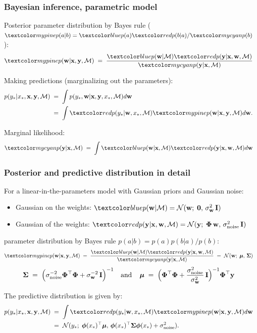 \begin{frame}
\frametitle{Bayesian inference, parametric model}

Posterior parameter distribution by Bayes rule ({\small $\Green{p(a|b)}=\Blue{p(a)} \Red{p(b|a)}/\Cyan{p(b)}$}):
\[
\Green{p({\bf w}|{\bf x},{\bf y},\mathcal{M})}\;=\;\frac{\Blue{p({\bf w}|\mathcal{M})}
\Red{p({\bf y}|{\bf x},{\bf w},\mathcal{M})}}{\Cyan{p({\bf y}|{\bf x},\mathcal{M})}}
\]

Making predictions (marginalizing out the parameters):
\[
\begin{split}
p(y_*|x_*,{\bf x}, {\bf y},\mathcal{M})\;&=\;
\int p(y_*,{\bf w}|{\bf x}, {\bf y}, x_*, \mathcal{M})d{\bf w}\\
&=\;\int \Red{p(y_*|{\bf w},x_*,\mathcal{M})}\Green{p({\bf w}|{\bf x}, {\bf y},\mathcal{M})}d{\bf w}.
\end{split}
\]

Marginal likelihood:
\[
\Cyan{p({\bf y}|{\bf x},\mathcal{M})}\;=\;
\int \Blue{p({\bf w}|\bfx,\mathcal{M})}  \Red{p(\bfy|\bfx,\bfw,\mathcal{M})}  d{\bf w}
\]
\end{frame}


\begin{frame}
\frametitle{Posterior and predictive distribution in detail}

For a linear-in-the-parameters model with Gaussian priors and Gaussian noise:
\begin{itemize}
\item Gaussian  on the weights: 
$\Blue{p(\bfw|\mathcal{M})}=\N(\bfw;\;\mathbf{0},\,\sigma_\bfw^2\,\bfI)$
\item Gaussian  of the weights:
$\Red{p(\bfy|\bfx,\bfw,\mathcal{M}})=\N(\bfy;\;\bPhi\,\bfw,\,\sigma_\mathrm{noise}^2\,\bfI)$
\end{itemize}

 parameter distribution by Bayes rule $p(a|b)=p(a)p(b|a)/p(b)$:
\[
\Green{p({\bf w}|{\bf x},{\bf y},\mathcal{M})}\;=\;\frac{\Blue{p({\bf w}|\mathcal{M})}
\Red{p({\bf y}|{\bf x},{\bf w},\mathcal{M})}}{\Cyan{p({\bf y}|{\bf x},\mathcal{M})}}
\;=\; \N(\bfw;\;\bmu,\,\bSigma)
\]
\[
\boldsymbol{\Sigma}\;=\;\left(\sigma_\mathrm{noise}^{-2}\boldsymbol{\Phi}^\top\boldsymbol{\Phi}+\sigma_\mathbf w^{-2}\,\mathbf I\right)^{-1}
\mathrm{\; \; \; and \; \; \; \; }
{\boldsymbol{\mu}}\;=\;
\Big(\boldsymbol{\Phi}^\top\boldsymbol{\Phi}+\frac{\sigma_\mathrm{noise}^2}{\sigma_\mathbf w^2}\,\mathbf I\Big)^{-1}\boldsymbol{\Phi}^\top\mathbf y
\]

The predictive distribution is given by:
\[
\begin{split}
p(y_*|x_*,{\bf x}, {\bf y},\mathcal{M})\;&=\;\int
\Red{p(y_*|{\bf w},x_*,\mathcal{M})}\Green{p({\bf w}|{\bf x}, {\bf y},\mathcal{M})}d{\bf w}\\
&=\;\N(y_*;\; \bphi(x_*)^\top\bmu,\,\bphi(x_*)^\top\bSigma\bphi(x_*)+\sigma_\mathrm{noise}^2).
\end{split}
\]
\end{frame}


